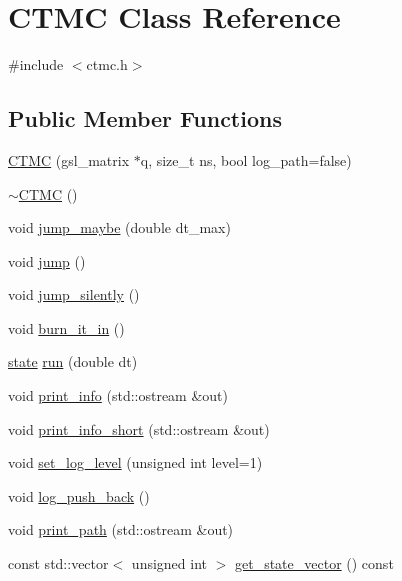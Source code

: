 \hypertarget{classCTMC}{}\section{C\+T\+MC Class Reference}
\label{classCTMC}


{\ttfamily \#include $<$ctmc.\+h$>$}

\subsection*{Public Member Functions}
\begin{DoxyCompactItemize}
\item 
\hyperlink{classCTMC_a83debe41139512a3fee5aefdfdfbd1b6}{C\+T\+MC} (gsl\+\_\+matrix $\ast$q, size\+\_\+t ns, bool log\+\_\+path=false)
\item 
\hyperlink{classCTMC_a0970e63a5bf714678fca63123be8cd87}{$\sim$\+C\+T\+MC} ()
\item 
void \hyperlink{classCTMC_a11dcb1006eee5d7d239257e3171ac9d7}{jump\+\_\+maybe} (double dt\+\_\+max)
\item 
void \hyperlink{classCTMC_a67388d53e74549f82f67271873d87dd9}{jump} ()
\item 
void \hyperlink{classCTMC_a3e200ff31cd91679d7b050fcc4547336}{jump\+\_\+silently} ()
\item 
void \hyperlink{classCTMC_adebed1754c9d39b4f87520d480030450}{burn\+\_\+it\+\_\+in} ()
\item 
\hyperlink{ctmc_8h_a981216161467119699bb029cc534bbca}{state} \hyperlink{classCTMC_ad95f38b7dcc275c5924f9280299e8312}{run} (double dt)
\item 
void \hyperlink{classCTMC_a73c61cebeb8221645fe7121e63aa520f}{print\+\_\+info} (std\+::ostream \&out)
\item 
void \hyperlink{classCTMC_ab9a92fd2378d26736c32eb309021506c}{print\+\_\+info\+\_\+short} (std\+::ostream \&out)
\item 
void \hyperlink{classCTMC_ae69dcedf459f8c4b7d353f53df27f91b}{set\+\_\+log\+\_\+level} (unsigned int level=1)
\item 
void \hyperlink{classCTMC_a9451758b0d0c4d3b14af4dda0e5252ad}{log\+\_\+push\+\_\+back} ()
\item 
void \hyperlink{classCTMC_a4bbba0ff2e4a23356575f0d15bb18c4c}{print\+\_\+path} (std\+::ostream \&out)
\item 
const std\+::vector$<$ unsigned int $>$ \hyperlink{classCTMC_a0de80520a9bbe71ad95a806a55c5c07a}{get\+\_\+state\+\_\+vector} () const 
\item 

\end{DoxyCompactItemize}
